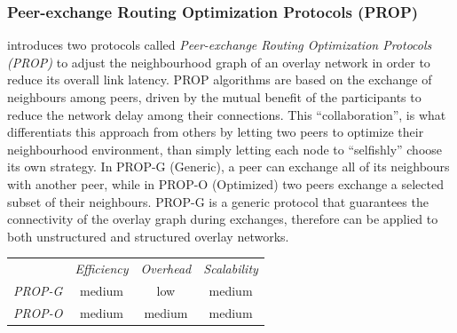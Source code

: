 \subsubsection{Peer-exchange Routing Optimization Protocols (PROP)}
\cite{QCYCZ2007} introduces two protocols called \emph{Peer-exchange Routing
Optimization Protocols (PROP)} to adjust the neighbourhood graph of an overlay
network in order to reduce its overall link latency. PROP algorithms are based
on the exchange of neighbours among peers, driven by the mutual benefit of the
participants to reduce the network delay among their connections. This
``collaboration'', is what differentiats this approach from others by letting
two peers to optimize their neighbourhood environment, than simply letting each
node to ``selfishly'' choose its own strategy. In PROP-G (Generic), a peer can
exchange all of its neighbours with another peer, while in PROP-O (Optimized)
two peers exchange a selected subset of their neighbours. PROP-G is a generic
protocol that guarantees the connectivity of the overlay graph during exchanges,
therefore can be applied to both unstructured and structured overlay networks.

\begin{center}
\begin{tabular}{rccc}
\multicolumn{1}{r}{} &
\multicolumn{1}{c}{\emph{Efficiency}} &
\multicolumn{1}{c}{\emph{Overhead}} &
\multicolumn{1}{c}{\emph{Scalability}}
\\
\cline{2-4}
\emph{PROP-G} &
medium &
low &
medium \\
\emph{PROP-O} &
medium &
medium &
medium \\
\end{tabular}
\end{center}


